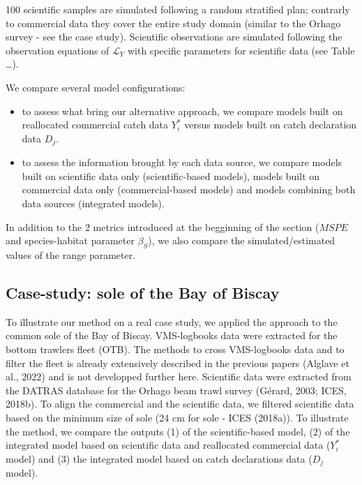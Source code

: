 \documentclass[
  english,
  man]{apa6}
\begin{document}
100 scientific samples are simulated following a random stratified plan; contrarly to commercial data they cover the entire study domain (similar to the Orhago survey - see the case study). Scientific observations are simulated following the observation equations of \(\mathcal{L}_Y\) with specific parameters for scientific data (see Table \ldots).

We compare several model configurations:

\begin{itemize}
\item
  to assess what bring our alternative approach, we compare models built on reallocated commercial catch data \(Y_i^*\) versus models built on catch declaration data \(D_j\).
\item
  to assess the information brought by each data source, we compare models built on scientific data only (scientific-based models), models built on commercial data only (commercial-based models) and models combining both data sources (integrated models).
\end{itemize}

In addition to the 2 metrics introduced at the begginning of the section (\(MSPE\) and species-habitat parameter \(\beta_S\)), we also compare the simulated/estimated values of the range parameter.

\hypertarget{case-study-sole-of-the-bay-of-biscay}{%
\subsection{Case-study: sole of the Bay of Biscay}\label{case-study-sole-of-the-bay-of-biscay}}

To illustrate our method on a real case study, we applied the approach to the common sole of the Bay of Biscay. VMS-logbooks data were extracted for the bottom trawlers fleet (OTB). The methods to cross VMS-logbooks data and to filter the fleet is already extensively described in the previous papers (Alglave et al., 2022) and is not developped further here. Scientific data were extracted from the DATRAS database for the Orhago beam trawl survey (Gérard, 2003; ICES, 2018b). To align the commercial and the scientific data, we filtered scientific data based on the minimum size of sole (24 cm for sole - ICES (2018a)). To illustrate the method, we compare the outputs (1) of the scientific-based model, (2) of the integrated model based on scientific data and reallocated commercial data (\(Y_i^*\) model) and (3) the integrated model based on catch declarations data (\(D_j\) model).
\end{document}
